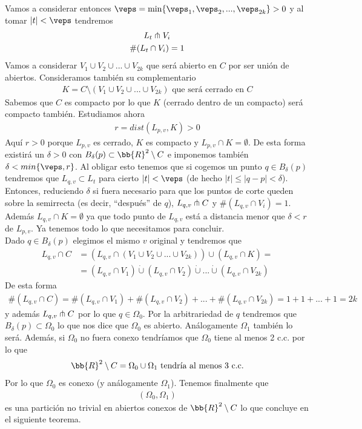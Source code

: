 Vamos a considerar entonces $\veps = \min\{\veps_1, \veps_2, ... , \veps_{2k}\}>0$ y al tomar $|t|<\veps$ tendremos
\begin{gather*}
    L_t \pitchfork V_i\\
    \#(L_t \cap V_i) = 1
\end{gather*}
Vamos a considerar $V_1\cup V_2 \cup ... \cup V_{2k}$ que será abierto en $C$ por ser unión de abiertos. Consideramos también su complementario
\begin{gather*}
    K = C\setminus (V_1\cup V_2 \cup ... \cup V_{2k}) \text{ que será cerrado en $C$}
\end{gather*}
Sabemos que $C$ es compacto por lo que $K$ (cerrado dentro de un compacto) será compacto también. Estudiamos ahora
\begin{gather*}
    r = dist(L_{p,v},K) > 0
\end{gather*}
Aquí $r>0$ porque $L_{p,v}$ es cerrado, $K$ es compacto y $L_{p,v}\cap K=\emptyset$. De esta forma existirá un $\delta>0$ con $B_\delta(p) \subset \bb{R}^2 \setminus C$ e imponemos también $\delta < min\{\veps, r\}$. Al obligar esto tenemos que si cogemos un punto $q\in B_\delta(p)$ tendremos que $L_{q,v} \subset L_t$ para cierto $|t| < \veps$ (de hecho $|t|\leq |q-p| < \delta$). Entonces, reduciendo $\delta$ si fuera necesario para que los puntos de corte queden sobre la semirrecta (es decir, ``después'' de $q$), $L_{q,v} \pitchfork C$ y $\#(L_{q,v} \cap V_i) = 1$. Además $L_{q,v} \cap K = \emptyset$ ya que todo punto de $L_{q,v}$ está a distancia menor que $\delta<r$ de $L_{p,v}$. Ya tenemos todo lo que necesitamos para concluir.\\

Dado $q\in B_\delta(p)$ elegimos el mismo $v$ original y tendremos que 
\begin{align*}
    L_{q,v}\cap C &= (L_{q,v} \cap (V_1\cup V_2 \cup ... \cup V_{2k})) \cup (L_{q,v}\cap K) =\\
    &= (L_{q,v} \cap V_1) \dot{\cup} (L_{q,v} \cap V_2) \dot{\cup} ... \dot{\cup} (L_{q,v} \cap V_{2k})
\end{align*}
De esta forma 
\begin{gather*}
    \#(L_{q,v}\cap C) = \#(L_{q,v} \cap V_1) + \#(L_{q,v} \cap V_2) + ... + \#(L_{q,v} \cap V_{2k}) = 1 + 1 + ... + 1 = 2k
\end{gather*}
y además $L_{q,v}\pitchfork C$ por lo que $q\in \Omega_0$. Por la arbitrariedad de $q$ tendremos que $B_\delta(p) \subset \Omega_0$ lo que nos dice que $\Omega_0$ es abierto. Análogamente $\Omega_1$ también lo será. Además, si $\Omega_0$ no fuera conexo tendríamos que $\Omega_0$ tiene al menos 2 c.c. por lo que 
\begin{gather*}
    \bb{R}^2 \setminus C = \Omega_0 \cup \Omega_1 \text{ tendría al menos 3 c.c.}
\end{gather*}
Por lo que $\Omega_0$ es conexo (y análogamente $\Omega_1$). Tenemos finalmente que 
\begin{gather*}
    (\Omega_0, \Omega_1)
\end{gather*}
es una partición no trivial en abiertos conexos de $\bb{R}^2 \setminus C$ lo que concluye en el siguiente teorema.

